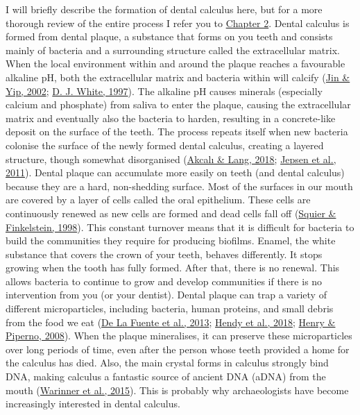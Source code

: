 \documentclass[
  letterpaper,
]{book}
\begin{document}
I will briefly describe the formation of dental calculus here, but for a
more thorough review of the entire process I refer you to
\protect\hyperlink{chap-background}{Chapter 2}. Dental calculus is
formed from dental plaque, a substance that forms on you teeth and
consists mainly of bacteria and a surrounding structure called the
extracellular matrix. When the local environment within and around the
plaque reaches a favourable alkaline pH, both the extracellular matrix
and bacteria within will calcify
(\protect\hyperlink{ref-jinSupragingivalCalculus2002}{Jin \& Yip, 2002};
\protect\hyperlink{ref-whiteDentalCalculus1997}{D. J. White, 1997}). The
alkaline pH causes minerals (especially calcium and phosphate) from
saliva to enter the plaque, causing the extracellular matrix and
eventually also the bacteria to harden, resulting in a concrete-like
deposit on the surface of the teeth. The process repeats itself when new
bacteria colonise the surface of the newly formed dental calculus,
creating a layered structure, though somewhat disorganised
(\protect\hyperlink{ref-akcaliDentalCalculus2018}{Akcalı \& Lang, 2018};
\protect\hyperlink{ref-jepsenCalculusRemoval2011}{Jepsen et al., 2011}).
Dental plaque can accumulate more easily on teeth (and dental calculus)
because they are a hard, non-shedding surface. Most of the surfaces in
our mouth are covered by a layer of cells called the oral epithelium.
These cells are continuously renewed as new cells are formed and dead
cells fall off (\protect\hyperlink{ref-squierOralMucosa1998}{Squier \&
Finkelstein, 1998}). This constant turnover means that it is difficult
for bacteria to build the communities they require for producing
biofilms. Enamel, the white substance that covers the crown of your
teeth, behaves differently. It stops growing when the tooth has fully
formed. After that, there is no renewal. This allows bacteria to
continue to grow and develop communities if there is no intervention
from you (or your dentist). Dental plaque can trap a variety of
different microparticles, including bacteria, human proteins, and small
debris from the food we eat
(\protect\hyperlink{ref-delafuenteDNAHuman2013}{De La Fuente et al.,
2013}; \protect\hyperlink{ref-hendyProteomicCalculus2018}{Hendy et al.,
2018}; \protect\hyperlink{ref-henryCalculusSyria2008}{Henry \& Piperno,
2008}). When the plaque mineralises, it can preserve these
microparticles over long periods of time, even after the person whose
teeth provided a home for the calculus has died. Also, the main crystal
forms in calculus strongly bind DNA, making calculus a fantastic source
of ancient DNA (aDNA) from the mouth
(\protect\hyperlink{ref-warinnerNewEra2015}{Warinner et al., 2015}).
This is probably why archaeologists have become increasingly interested
in dental calculus.
\end{document}
